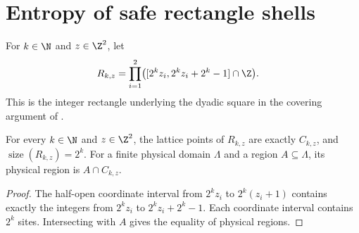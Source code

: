 \section{Entropy of safe rectangle shells}

\begin{definition}
    \label{def:area_template_dyadic_rectangle}
    \leanok
    For $k\in\N$ and $z\in\Z^2$, let
    \begin{align}
        R_{k,z}
         & =\prod_{i=1}^{2}\bigl([2^kz_i,2^kz_i+2^k-1]\cap\Z\bigr).
    \end{align}
    This is the integer rectangle underlying the dyadic square in the
    covering argument of \cite[Lemma~9.4, lines~641--649]{OpenAI2026AreaLaw}.
\end{definition}

\begin{lemma}
    \label{thm:area_template_dyadic_rectangle}
    \leanok
    For every $k\in\N$ and $z\in\Z^2$, the lattice points of $R_{k,z}$
    are exactly $C_{k,z}$, and $\operatorname{size}(R_{k,z})=2^k$.
    For a finite physical domain $\Lambda$ and a region $A\subseteq\Lambda$,
    its physical region is $A\cap C_{k,z}$.
\end{lemma}
\begin{proof}
    \leanok
    The half-open coordinate interval from $2^kz_i$ to $2^k(z_i+1)$
    contains exactly the integers from $2^kz_i$ to $2^kz_i+2^k-1$.
    Each coordinate interval contains $2^k$ sites. Intersecting with
    $A$ gives the equality of physical regions.
\end{proof}

